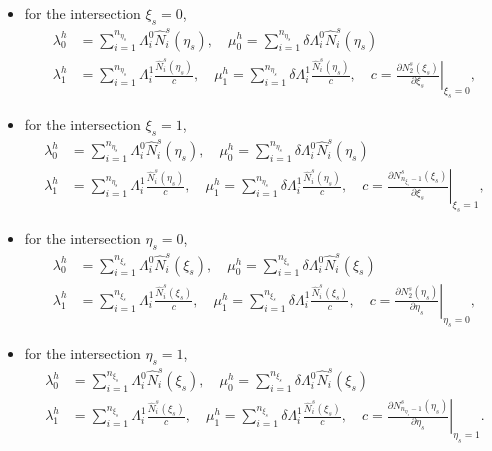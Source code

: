 \begin{itemize}
  \item for the intersection $\xi_s=0$,
        \begin{equation}
          \begin{split}
            \lambda_0^h&=\sum_{i=1}^{n_{\eta_s}}\Lambda^0_i\hat{N}^s_i(\eta_s),\quad  \mu_0^h=\sum_{i=1}^{n_{\eta_s}}\delta\Lambda^0_i\hat{N}^s_i(\eta_s)\\
            \lambda_1^h&=\sum_{i=1}^{n_{\eta_s}}\Lambda^1_i\frac{\hat{N}^s_i(\eta_s)}{c}, \quad \mu_1^h=\sum_{i=1}^{n_{\eta_s}}\delta\Lambda^1_i\frac{\hat{N}^s_i(\eta_s)}{c},\quad c=\left.\frac{\partial{N^s_2(\xi_s)}}{\partial{\xi_s}}\right|_{\xi_s=0},
          \end{split}
        \end{equation}
  \item for the intersection $\xi_s=1$,
        \begin{equation}
          \begin{split}
            \lambda_0^h&=\sum_{i=1}^{n_{\eta_s}}\Lambda^0_i\hat{N}^s_i(\eta_s),\quad \mu_0^h=\sum_{i=1}^{n_{\eta_s}}\delta\Lambda^0_i\hat{N}^s_i(\eta_s)\\
            \lambda_1^h&=\sum_{i=1}^{n_{\eta_s}}\Lambda^1_i\frac{\hat{N}^s_i(\eta_s)}{c},\quad \mu_1^h=\sum_{i=1}^{n_{\eta_s}}\delta\Lambda^1_i\frac{\hat{N}^s_i(\eta_s)}{c},\quad c=\left.\frac{\partial{N^s_{n_{\xi_s}-1}(\xi_s)}}{\partial{\xi_s}}\right|_{\xi_s=1},
          \end{split}
        \end{equation}
  \item for the intersection $\eta_s=0$,
        \begin{equation}
          \begin{split}
            \lambda_0^h&=\sum_{i=1}^{n_{\xi_s}}\Lambda^0_i\hat{N}^s_i(\xi_s),\quad \mu_0^h=\sum_{i=1}^{n_{\xi_s}}\delta\Lambda^0_i\hat{N}^s_i(\xi_s)\\
            \lambda_1^h&=\sum_{i=1}^{n_{\xi_s}}\Lambda^1_i\frac{\hat{N}^s_i(\xi_s)}{c},\quad \mu_1^h=\sum_{i=1}^{n_{\xi_s}}\delta\Lambda^1_i\frac{\hat{N}^s_i(\xi_s)}{c},\quad c=\left.\frac{\partial{N^s_2(\eta_s)}}{\partial{\eta_s}}\right|_{\eta_s=0},
          \end{split}
        \end{equation}
  \item for the intersection $\eta_s=1$,
        \begin{equation}
          \begin{split}
            \lambda_0^h&=\sum_{i=1}^{n_{\xi_s}}\Lambda^0_i\hat{N}^s_i(\xi_s), \quad  \mu_0^h=\sum_{i=1}^{n_{\xi_s}}\delta\Lambda^0_i\hat{N}^s_i(\xi_s)\\
            \lambda_1^h&=\sum_{i=1}^{n_{\xi_s}}\Lambda^1_i\frac{\hat{N}^s_i(\xi_s)}{c},\quad \mu_1^h=\sum_{i=1}^{n_{\xi_s}}\delta\Lambda^1_i\frac{\hat{N}^s_i(\xi_s)}{c},\quad c=\left.\frac{\partial{N^s_{n_{\eta_s}-1}(\eta_s)}}{\partial{\eta_s}}\right|_{\eta_s=1}.
          \end{split}
        \end{equation}
\end{itemize}\par

